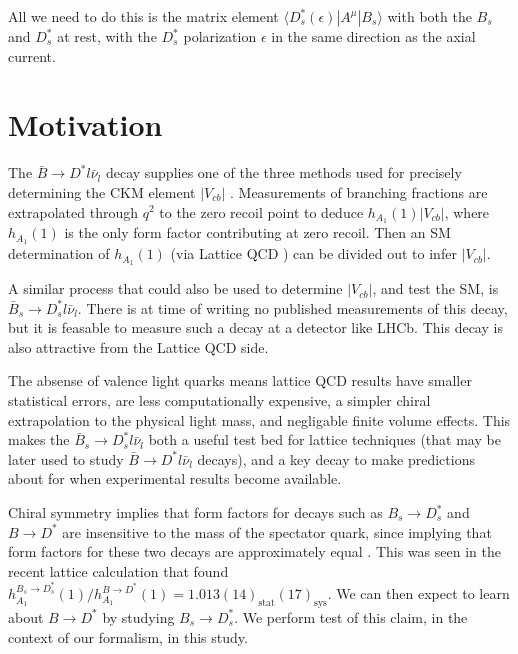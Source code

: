 All we need to do this is the matrix element $\langle D^*_s(\epsilon)| A^{\mu} | B_s \rangle$ with both the $B_s$ and $D_s^*$ at rest, with the $D_s^*$ polarization $\epsilon$ in the same direction as the axial current.

\section{Motivation}
\label{sec:BsDsstar_intro}

The $\bar{B}\to D^{*} l \bar{\nu}_l$ decay supplies one of the three methods used for precisely determining the CKM element $|V_{cb}|$ \cite{Schroder:1994aj,PhysRevLett.64.2117,PhysRevD.43.651,ALBRECHT1992195,Barish:1994mu,BUSKULIC1996449,Buskulic:1994dz,Abbiendi:2000hk,Abreu:2001ic,Adam:2002uw,Abdallah:2004rz,Aubert:2007rs,Aubert:2007qs,Aubert:2008yv,Dungel:2010uk,Abdesselam:2017kjf,Bailey:2014tva,Abdesselam:2018nnh}.
Measurements of branching fractions are extrapolated through $q^2$ to the zero recoil point to deduce $h_{A_1}(1) |V_{cb}|$, where $h_{A_1}(1)$ is the only form factor contributing at zero recoil. Then an SM determination of $h_{A_1}(1)$ (via Lattice QCD \cite{Bailey:2014tva,Harrison:2017fmw}) can be divided out to infer $|V_{cb}|$.

A similar process that could also be used to determine $|V_{cb}|$, and test the SM, is $\bar{B}_s \to D^*_s l\bar{\nu}_l$. There is at time of writing no published measurements of this decay, but it is feasable to measure such a decay at a detector like LHCb. This decay is also attractive from the Lattice QCD side.

The absense of valence light quarks means lattice QCD results have smaller statistical errors, are less computationally expensive, a simpler chiral extrapolation to the physical light mass, and negligable finite volume effects. This makes the $\bar{B}_s \to D^*_s l\bar{\nu}_l$ both a useful test bed for lattice techniques (that may be later used to study $\bar{B} \to D^* l \bar{\nu}_l$ decays), and a key decay to make predictions about for when experimental results become available.

Chiral symmetry implies that form factors for decays such as $B_s \to D^*_s$ and $B \to D^*$ are insensitive to the mass of the spectator quark, since  implying that form factors for these two decays are approximately equal \cite{Laiho:2005ue}. This was seen in the recent lattice calculation \cite{Harrison:2017fmw} that found $h_{A_1}^{B_s\to D_s^*}(1) / h_{A_1}^{B\to D^*}(1) = 1.013(14)_{\text{stat}}(17)_{\text{sys}}$. We can then expect to learn about $B\to D^*$ by studying $B_s\to D_s^*$. We perform test of this claim, in the context of our formalism, in this study.

